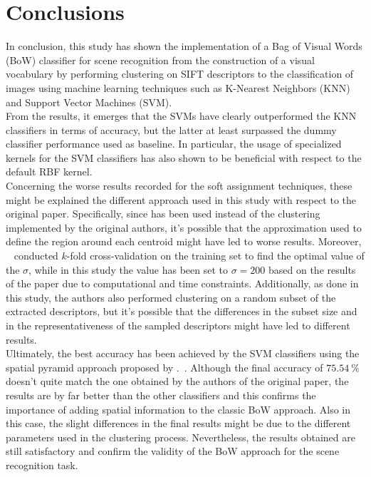 \documentclass[../main.tex]{subfiles}
\begin{document}
\section{Conclusions}\label{sec:conclusions}

In conclusion, this study has shown the implementation of a Bag of Visual Words
(BoW) classifier for scene recognition from the construction of a visual
vocabulary by performing clustering on SIFT descriptors to the classification of
images using machine learning techniques such as K-Nearest Neighbors (KNN) and Support Vector Machines (SVM).\\
From the results, it emerges that the SVMs have clearly outperformed the KNN
classifiers in terms of accuracy, but the latter at least surpassed the dummy
classifier performance used as baseline. In particular, the usage of specialized
kernels for the SVM classifiers has also shown to be beneficial with respect to the default RBF kernel.\\
Concerning the worse results recorded for the soft assignment techniques, these
might be explained the different approach used in this study with respect to the
original paper. Specifically, since  has been
used instead of the  clustering implemented by the original
authors, it's possible that the approximation used to define the region around
each centroid might have led to worse results.
Moreover, ~\cite{gemert} conducted $k$-fold
cross-validation on the training set to find the optimal value of the $\sigma$,
while in this study the value has been set to $\sigma = 200$ based on the
results of the paper due to computational and time constraints. Additionally, as
done in this study,
the authors also performed clustering on a random subset of the extracted
descriptors, but it's possible that the differences in the subset size and in
the
representativeness of the sampled descriptors might have led to different results.\\
Ultimately, the best accuracy has been achieved by the SVM classifiers using the
spatial pyramid approach proposed by .~\cite{lazebnik}.
Although the final accuracy of $\SI{75.54}{\percent}$ doesn't quite match the
one obtained by the authors of the original paper, the results are by far better
than the other classifiers and this confirms the importance of adding spatial
information to the classic BoW approach. Also in this case, the slight
differences in the final results might be due to the different parameters used
in the clustering process.
Nevertheless, the results obtained are still satisfactory and confirm the validity of the BoW approach for the scene recognition task.
\end{document}
